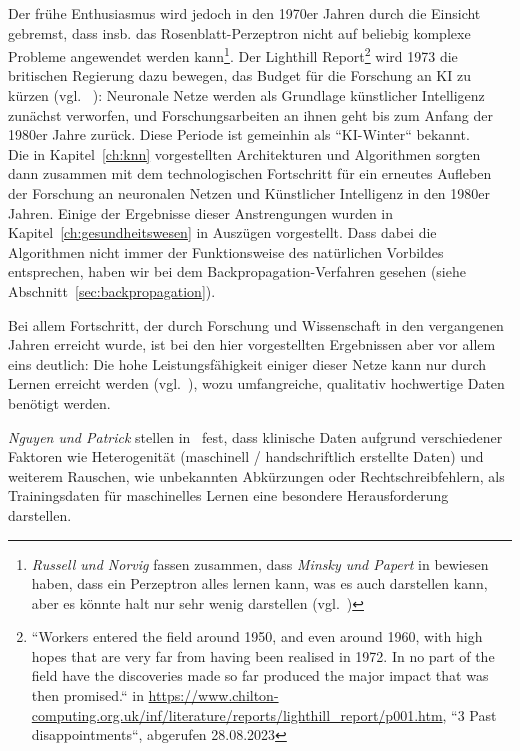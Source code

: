 Der frühe Enthusiasmus wird jedoch in den 1970er Jahren durch die Einsicht gebremst, dass {insb.} das Rosenblatt-Perzeptron nicht auf beliebig komplexe Probleme angewendet werden kann\footnote{
    \textit{Russell und Norvig} fassen zusammen, dass \textit{Minsky und Papert} in \cite{MP88} bewiesen haben, dass ein Perzeptron alles lernen kann, was es auch darstellen kann, aber es könnte halt nur sehr wenig darstellen (vgl.~\cite[45]{RN09})
}.
Der Lighthill Report\footnote{
    ``Workers entered the field around 1950, and even around 1960, with high hopes that are very far from having been realised in 1972. In no part of the field have the discoveries made so far produced the major impact that was then promised.`` in \url{https://www.chilton-computing.org.uk/inf/literature/reports/lighthill\_report/p001.htm}, ``3 Past disappointments``, abgerufen 28.08.2023
} wird 1973 die britischen Regierung dazu bewegen, das Budget für die Forschung an KI zu kürzen (vgl. ~\cite[45]{RN09}): Neuronale Netze werden als Grundlage künstlicher Intelligenz zunächst verworfen, und Forschungsarbeiten an ihnen geht bis zum Anfang der 1980er Jahre zurück.
Diese Periode ist gemeinhin als ``KI-Winter`` bekannt.\\

Die in Kapitel~\ref{ch:knn} vorgestellten Architekturen und Algorithmen sorgten dann zusammen mit dem technologischen Fortschritt für ein erneutes Aufleben der Forschung an neuronalen Netzen und Künstlicher Intelligenz in den 1980er Jahren.
Einige der Ergebnisse dieser Anstrengungen wurden in Kapitel~\ref{ch:gesundheitswesen} in Auszügen vorgestellt.
Dass dabei die Algorithmen nicht immer der Funktionsweise des natürlichen Vorbildes entsprechen, haben wir bei dem Backpropagation-Verfahren gesehen (siehe Abschnitt~\ref{sec:backpropagation}).

Bei allem Fortschritt, der durch Forschung und Wissenschaft in den vergangenen Jahren erreicht wurde, ist bei den hier vorgestellten Ergebnissen aber vor allem eins deutlich: Die hohe Leistungsfähigkeit einiger dieser Netze kann nur durch Lernen erreicht werden (vgl.~\cite[40]{AHR19}), wozu umfangreiche, qualitativ hochwertige Daten benötigt werden.

\textit{Nguyen und Patrick} stellen in~\cite{NP16} fest, dass klinische Daten aufgrund verschiedener Faktoren wie Heterogenität (maschinell / handschriftlich erstellte Daten) und weiterem Rauschen, wie unbekannten Abkürzungen oder Rechtschreibfehlern, als Trainingsdaten für maschinelles Lernen eine besondere Herausforderung darstellen.

